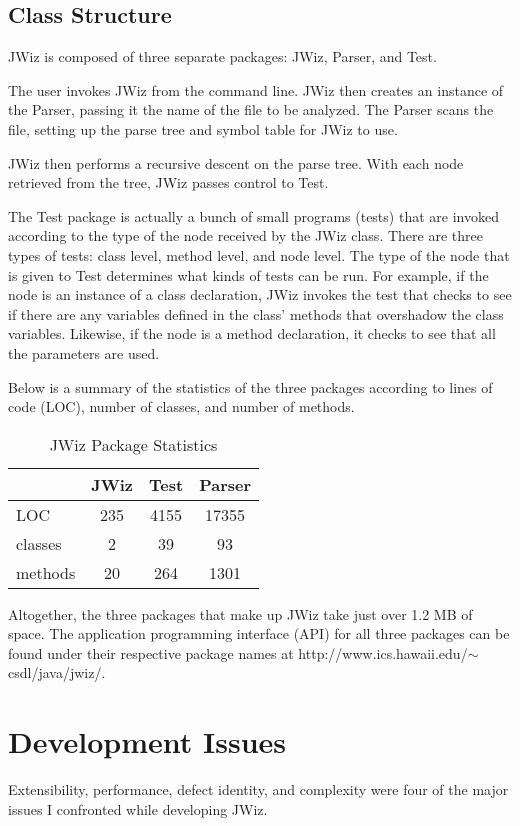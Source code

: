 \subsection{Class Structure}
JWiz is composed of three separate packages: JWiz, Parser, and Test.  

The user invokes JWiz from the command line.  JWiz then creates an instance
of the Parser, passing it the name of the file to be analyzed.  The Parser
scans the file, setting up the parse tree and symbol table for JWiz to use.

JWiz then performs a recursive descent on the parse tree.  With each node
retrieved from the tree, JWiz passes control to Test.  

The Test package is actually a bunch of small programs (tests) that are
invoked according to the type of the node received by the JWiz class.
There are three types of tests: class level, method level, and node level.
The type of the node that is given to Test determines what kinds of tests
can be run.  For example, if the node is an instance of a class
declaration, JWiz invokes the test that checks to see if there are any
variables defined in the class' methods that overshadow the class
variables.  Likewise, if the node is a method declaration, it checks to see
that all the parameters are used.

Below is a summary of the statistics of the three packages according to
lines of code (LOC), number of classes, and number of methods.
 
\begin{table}[htpb]
  \caption{JWiz Package Statistics}
  \begin{center}
  \begin{tabular}{|l|c|c|c|}
    \hline & JWiz & Test & Parser \\ \hline \hline
    LOC & 235 & 4155 & 17355 \\ \hline
    classes & 2 & 39 & 93  \\ \hline
    methods & 20 & 264 & 1301 \\ \hline
   \end{tabular}
  \end{center}
 \label{packageStats}
\end{table}
\newpage
Altogether, the three packages that make up JWiz take just over 1.2 MB of
space.  The application programming interface (API) for all three packages
can be found under their respective package names at
http://www.ics.hawaii.edu/$\sim$csdl/java/jwiz/.

\section{Development Issues}
Extensibility, performance, defect identity, and complexity were four of
the major issues I confronted while developing JWiz.
